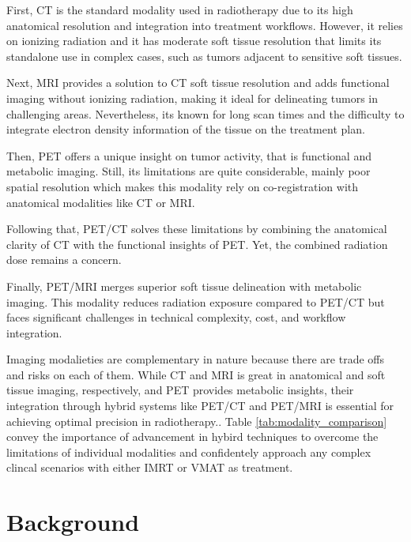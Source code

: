 \documentclass[11pt]{article} %
\begin{document}
\begin{multicols}{2}

First, CT is the standard modality used in radiotherapy due to its high anatomical resolution and integration into treatment workflows. However, it relies on ionizing radiation and it has moderate soft tissue resolution that limits its standalone use in complex cases, such as tumors adjacent to sensitive soft tissues. 

Next, MRI provides a solution to CT soft tissue resolution and adds functional imaging without ionizing radiation, making it ideal for delineating tumors in challenging areas.  Nevertheless, its known for long scan times and the difficulty to integrate electron density information of the tissue on the treatment plan. 

Then, PET offers a unique insight on tumor activity, that is functional and metabolic imaging. Still, its limitations are quite considerable, mainly poor spatial resolution which makes this modality rely on co-registration with anatomical modalities like CT or MRI. 

Following that, PET/CT solves these limitations by combining the anatomical clarity of CT with the functional insights of PET. Yet, the combined radiation dose remains a concern. 

Finally, PET/MRI merges superior soft tissue delineation with metabolic imaging. This modality reduces radiation exposure compared to PET/CT but faces significant challenges in technical complexity, cost, and workflow integration.

Imaging modalieties are complementary in nature because there are trade offs and risks on each of them. While CT and MRI is great in anatomical and soft tissue imaging, respectively, and PET provides metabolic insights, their integration through hybrid systems like PET/CT and PET/MRI is essential for achieving optimal precision in radiotherapy.\cite{decazes2021, yan2024}. Table \ref{tab:modality_comparison} convey the importance of advancement in hybird techniques to overcome the limitations of individual modalities and confidentely approach any complex clincal scenarios with either IMRT or VMAT as treatment.



\section{Background}


\end{multicols}
\end{document}
